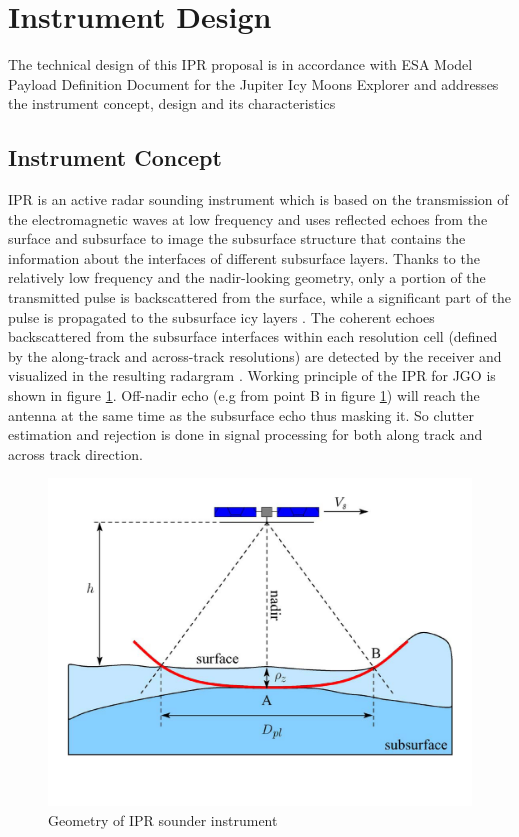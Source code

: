 \section{Instrument Design}
\label{IPR_design}
The technical design of this \ac{IPR} proposal is in accordance with ESA Model Payload Definition Document for the Jupiter Icy Moons Explorer \cite{JGO_Payload_def} and addresses the instrument concept, design and its characteristics 
\subsection{Instrument Concept}
\ac{IPR} is an active radar sounding instrument which is based on the transmission of the electromagnetic waves at low frequency and uses reflected echoes from the surface and subsurface to image the subsurface structure that contains the information about the interfaces of different subsurface layers. Thanks to the relatively low frequency and the nadir-looking geometry, only a portion of the transmitted pulse is backscattered from the surface, while a significant part of the pulse is propagated to the subsurface icy layers \cite{Gany_SRS}. The coherent echoes backscattered from the subsurface interfaces within each resolution cell (defined by the along-track and across-track resolutions) are detected by the receiver and visualized in the resulting radargram \cite{Gany_SRS}. Working principle of the \ac{IPR} for \ac{JGO} is shown in figure \ref{fig:IPR_concept}. Off-nadir echo (e.g from point B in figure \ref{fig:IPR_concept}) will reach the antenna at the same time as the subsurface echo thus masking it. 
So clutter estimation and rejection is done in signal processing for both along track and across track direction.\\
%
\begin{figure}[bht]
\centering
\includegraphics[scale=0.5]{Figures/IPR_Concept.pdf}
\caption{Geometry of \ac{IPR} sounder instrument \cite{Gany_SRS}} 
\label{fig:IPR_concept}
\end{figure}
%
